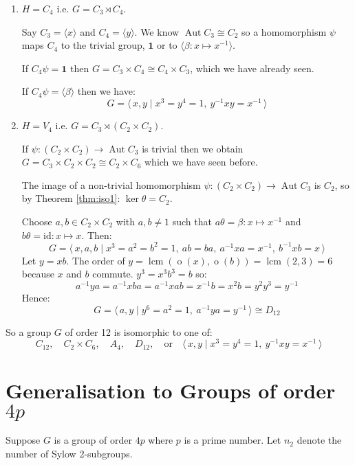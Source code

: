 \documentclass[a4paper, oneside, 12pt, final]{article}
\theoremstyle{definition}
\DeclareMathOperator{\Aut}{Aut}
\DeclareMathOperator{\order}{o}
\DeclareMathOperator{\lcm}{lcm}
\begin{document}
\begin{enumerate}
    \item \(H = C_4\) i.e. \(G = C_3 \rtimes C_4\).

        Say \(C_3 = \langle x \rangle\) and \(C_4 = \langle y \rangle\).
        We know \(\Aut{C_3} \cong C_2\) so a homomorphism \(\psi\) maps \(C_4\)
        to the trivial group, \(\bm{1}\) or to \(\langle \beta:x \mapsto x^{-1}
        \rangle\).

        If \(C_4\psi = \bm{1}\) then \(G = C_3 \times C_4 \cong C_4 \times
        C_3\), which we have already seen.

        If \(C_4\psi = \langle \beta \rangle\) then we have:
        \[G = \langle\, x, y \mid x^3 = y^4 = 1,\ y^{-1}xy = x^{-1}\,\rangle\]

    \item \(H = V_4\) i.e. \(G = C_3 \rtimes (C_2 \times C_2)\).

        If \(\psi:(C_2 \times C_2) \to \Aut{C_3}\) is trivial then we obtain
        \(G = C_3 \times C_2 \times C_2 \cong C_2 \times C_6\) which we have
        seen before.

        The image of a non-trivial homomorphism \(\psi:(C_2 \times C_2) \to
        \Aut{C_3}\) is \(C_2\), so by Theorem \ref{thm:iso1}: \(\ker{\theta} =
        C_2\).

        Choose \(a, b \in C_2 \times C_2\) with \(a, b \neq 1\) such that
        \(a\theta = \beta:x \mapsto x^{-1}\) and \(b\theta = \text{id}:x
        \mapsto x\).
        Then:
        \[G = \langle\, x, a, b \mid x^3 = a^2 = b^2 = 1,\ ab = ba,\ a^{-1}xa =
        x^{-1},\ b^{-1}xb = x\,\rangle\]
        Let \(y = xb\).
        The order of \(y = \lcm{(\order{(x)}, \order{(b)})} = \lcm{(2, 3)} =
        6\) because \(x\) and \(b\) commute.
        \(y^3 = x^3b^3 = b\) so:
        \[ a^{-1}ya = a^{-1}xba = a^{-1}xab = x^{-1}b = x^2b = y^2y^3 = y^{-1}\]
        Hence:
        \[G = \langle\, a, y \mid y^6 = a^2 = 1,\ a^{-1}ya = y^{-1}\,\rangle
        \cong D_{12}\]
\end{enumerate}

So a group \(G\) of order 12 is isomorphic to one of:
\[
    C_{12}, \quad%
    C_2 \times C_6, \quad%
    A_4, \quad%
    D_{12}, \quad \text{or} \quad%
    \langle\, x, y \mid x^3 = y^4 = 1,\ y^{-1}xy = x^{-1}\,\rangle
\]

\section{Generalisation to Groups of order \(4p\)}
Suppose \(G\) is a group of order \(4p\) where \(p\) is a prime number.
Let \(n_2\) denote the number of Sylow 2-subgroups.
\end{document}

